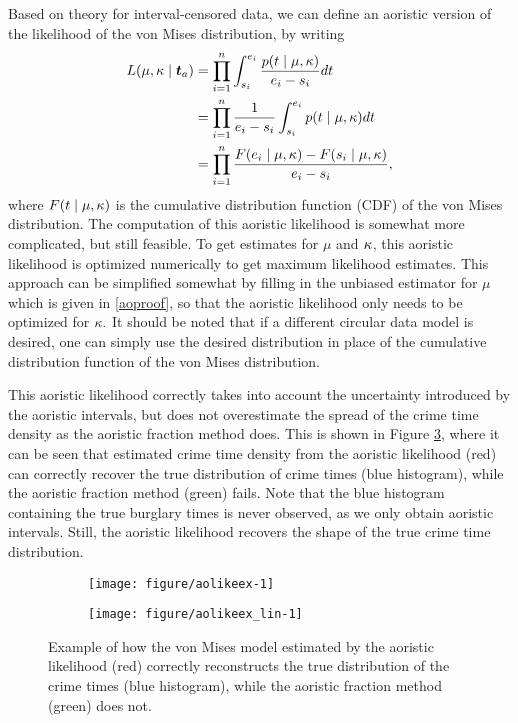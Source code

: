 Based on theory for interval-censored data, we can define an aoristic version of the likelihood of the von Mises distribution, by writing
\begin{align}
L( \mu, \kappa \mid \boldsymbol{t}_a ) &= \prod_{i = 1}^n \int_{s_i}^{e_i} \frac{p(t \mid \mu, \kappa)}{e_i - s_i} dt \\
&= \prod_{i = 1}^n \frac{1}{e_i - s_i}  \int_{s_i}^{e_i}  p(t \mid \mu, \kappa) dt \\
&= \prod_{i = 1}^n \frac{F(e_i \mid \mu, \kappa) - F(s_i \mid \mu, \kappa)}{e_i - s_i},
\end{align}
where \( F(t \mid \mu, \kappa) \) is the cumulative distribution function (CDF) of the von Mises distribution. The computation of this aoristic likelihood is somewhat more complicated, but still feasible. To get estimates for $\mu$ and $\kappa$, this aoristic likelihood is optimized numerically to get maximum likelihood estimates. This approach can be simplified somewhat by filling in the unbiased estimator for $\mu$ which is given in \ref{aoproof}, so that the aoristic likelihood only needs to be optimized for $\kappa.$ It should be noted that if a different circular data model is desired, one can simply use the desired distribution in place of the cumulative distribution function of the von Mises distribution.

This aoristic likelihood correctly takes into account the uncertainty introduced by the aoristic intervals, but does not overestimate the spread of the crime time density as the aoristic fraction method does. This is shown in Figure \ref{aolikeex}, where it can be seen that estimated crime time density from the aoristic likelihood (red) can correctly recover the true distribution of crime times (blue histogram), while the aoristic fraction method (green) fails. Note that the blue histogram containing the true burglary times is never observed, as we only obtain aoristic intervals. Still, the aoristic likelihood recovers the shape of the true crime time distribution.

\begin{figure}
\centering
\begin{subfigure}[b]{0.5\linewidth}
\centering
\begin{knitrout}
\color{fgcolor}
\texttt{[image: figure/aolikeex-1]} 

\end{knitrout}
\caption{} \label{aolikeex_circ}
\end{subfigure}%
\begin{subfigure}[b]{0.5\linewidth}
\centering
\begin{knitrout}
\color{fgcolor}
\texttt{[image: figure/aolikeex\_lin-1]} 

\end{knitrout}
\caption{} \label{aolikeex_lin}
\end{subfigure}%
\caption{Example of how the von Mises model estimated by the aoristic likelihood (red) correctly reconstructs the true distribution of the crime times (blue histogram), while the aoristic fraction method (green) does not.} \label{aolikeex}
\end{figure}


